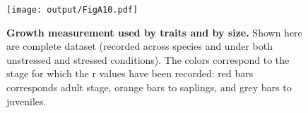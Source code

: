 \documentclass[a4paper]{article}\usepackage[]{graphicx}\usepackage[]{color}
\begin{document}
\begin{appendices}
\begin{figure}[htbp]
\label{FigA9}
\end{figure}

\begin{figure}[htbp]
\centering
\texttt{[image: output/FigA10.pdf]}
\caption{\textbf{Growth measurement used by traits and by size.} Shown here are complete dataset (recorded across  species and under both unstressed and stressed conditions). The colors correspond to the stage for which the r values have been recorded: red bars corresponds adult stage, orange bars to saplings, and grey bars to juveniles.}
\label{FigA10}
\end{figure}

\end{appendices}
\end{document}
